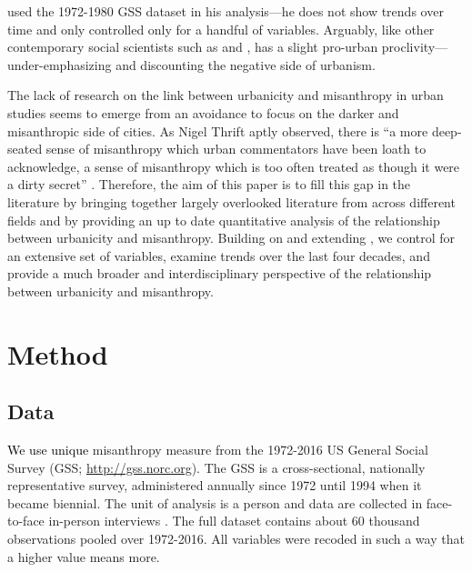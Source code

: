 \documentclass[11pt, letterpaper]{article}
\newcommand{\hilite}[1]{\textcolor{black}{#1}}
\begin{document}
\begin{spacing}{1.4}
\citet{wilson85} used the 1972-1980 GSS dataset in his analysis---he does not show trends over time and only  controlled only for a handful of variables.  Arguably, like other
contemporary social scientists such as \citet[][]{veenhoven94,meyer13} and
\citet[][]{fischer82}, \citeauthor{wilson85} has a slight pro-urban
proclivity---under-emphasizing and discounting the negative side of urbanism.  

The lack of research on the link between urbanicity and misanthropy in urban studies
seems to emerge from an avoidance to focus on the darker and misanthropic side
of cities. As Nigel Thrift aptly observed, there is ``a more deep-seated sense of misanthropy which urban commentators have been loath to acknowledge, a sense of misanthropy which is too often treated as though it were a dirty secret'' \citep[p. 134]{thrift05}. Therefore, the aim of this paper is to fill this gap in the literature by
bringing together largely overlooked literature from across different fields and
by providing an up to date quantitative analysis of the relationship between
urbanicity and misanthropy. Building on and extending \citet{wilson85}, we control for an extensive set of variables, examine trends over the last four decades, and provide a much broader and interdisciplinary perspective of the relationship between urbanicity and misanthropy. 



\section*{Method} 

\subsection*{Data}

\hilite{We use unique} misanthropy measure from the 1972-2016 US General Social Survey (GSS;
\url{http://gss.norc.org}). The GSS is a cross-sectional, nationally
representative survey, administered annually since 1972 until 1994 when it
became biennial. The unit of analysis is a person and data are collected in face-to-face in-person interviews \citep{davis07}. The full dataset contains about 60 thousand observations pooled over 1972-2016. All variables were recoded in such a way that a higher value means more. 


\end{spacing}
\end{document}
